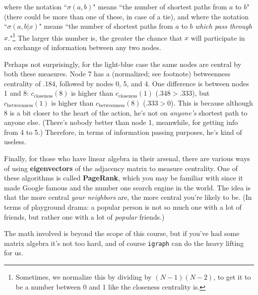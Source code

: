 \documentclass[12pt]{article}
\begin{document}
where the notation ``$\sigma(a,b)$" means ``the number of shortest paths from
$a$ to $b$" (there could be more than one of these, in case of a tie), and
where the notation ``$\sigma(a,b|x)$" means ``the number of shortest paths
from $a$ to $b$ \textit{which pass through $x$}."\footnote{Sometimes, we
normalize this by dividing by $(N-1)(N-2)$, to get it to be a number between 0
and 1 like the closeness centrality is.} The larger this number is, the
greater the chance that $x$ will participate in an exchange of information
between any two nodes.


Perhaps not surprisingly, for the light-blue case the same nodes are central
by both these measures. Node 7 has a (normalized; see footnote) betweenness
centrality of .184, followed by nodes 0, 5, and 4. One difference is between
nodes 1 and 8: $c_{\textrm{closeness}}(8)$ is higher than
$c_{\textrm{closeness}}(1)$ ($.348 > .333$), but $c_{\textrm{betweenness}}(1)$
is higher than $c_{\textrm{betweenness}}(8)$ ($.333 > 0$). This is because
although 8 is a bit closer to the heart of the action, he's not on
\textit{anyone's} shortest path to anyone else. (There's nobody better than
node 1, meanwhile, for getting info from 4 to 5.) Therefore, in terms of
information passing purposes, he's kind of useless.


\vspace{.2in}

Finally, for those who have linear algebra in their arsenal, there are various
ways of using \textbf{eigenvectors} of the adjacency matrix to measure
centrality. One of these algorithms is called \textbf{PageRank}, which you may
be familiar with since it made Google famous and the number one search engine
in the world. The idea is that the more central \textit{your neighbors} are,
the more central you're likely to be. (In terms of playground drama: a popular
person is not so much one with a lot of friends, but rather one with a lot of
\textit{popular} friends.)

The math involved is beyond the scope of this course, but if you've had some
matrix algebra it's not too hard, and of course \texttt{igraph} can do the
heavy lifting for us.
\end{document}
